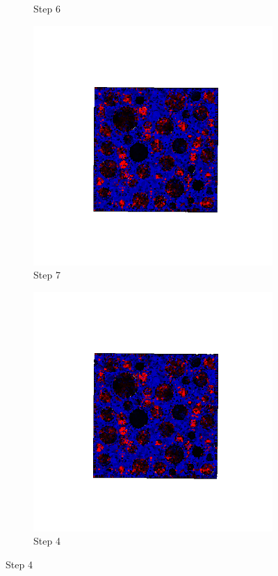 \begin{figure}[ht!]
\begin{subfigure}{.25\textwidth}
      \caption{Step 6}
      \end{subfigure}%
      \begin{subfigure}{.25\textwidth}
        \centering
        \includegraphics[width=1.0\linewidth]{Files/A30P75_3_IS/DEP50-STEP(007).png}
      \caption{Step 7}
      \end{subfigure}%
      \begin{subfigure}{.25\textwidth}
        \centering
        \includegraphics[width=1.0\linewidth]{Files/A30P75_3_IS/DEP50-STEP(008).png}
      \caption{Step 4}
      \end{subfigure}


\end{figure}
